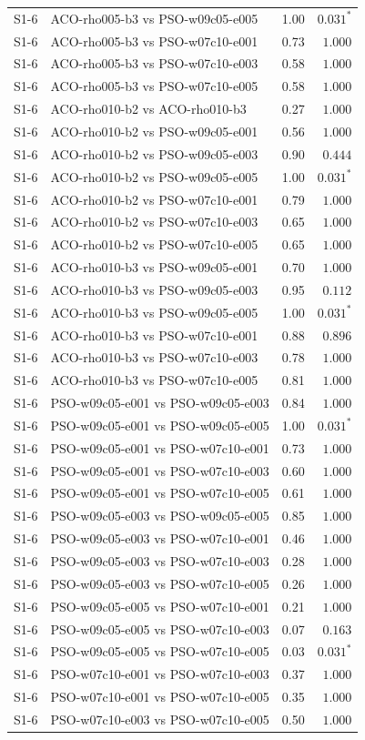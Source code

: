 \begin{tabular}{llrr}
S1-6 & ACO-rho005-b3 vs PSO-w09c05-e005 & 1.00 & $0.031^{*}$ \\
S1-6 & ACO-rho005-b3 vs PSO-w07c10-e001 & 0.73 & $1.000$ \\
S1-6 & ACO-rho005-b3 vs PSO-w07c10-e003 & 0.58 & $1.000$ \\
S1-6 & ACO-rho005-b3 vs PSO-w07c10-e005 & 0.58 & $1.000$ \\
S1-6 & ACO-rho010-b2 vs ACO-rho010-b3 & 0.27 & $1.000$ \\
S1-6 & ACO-rho010-b2 vs PSO-w09c05-e001 & 0.56 & $1.000$ \\
S1-6 & ACO-rho010-b2 vs PSO-w09c05-e003 & 0.90 & $0.444$ \\
S1-6 & ACO-rho010-b2 vs PSO-w09c05-e005 & 1.00 & $0.031^{*}$ \\
S1-6 & ACO-rho010-b2 vs PSO-w07c10-e001 & 0.79 & $1.000$ \\
S1-6 & ACO-rho010-b2 vs PSO-w07c10-e003 & 0.65 & $1.000$ \\
S1-6 & ACO-rho010-b2 vs PSO-w07c10-e005 & 0.65 & $1.000$ \\
S1-6 & ACO-rho010-b3 vs PSO-w09c05-e001 & 0.70 & $1.000$ \\
S1-6 & ACO-rho010-b3 vs PSO-w09c05-e003 & 0.95 & $0.112$ \\
S1-6 & ACO-rho010-b3 vs PSO-w09c05-e005 & 1.00 & $0.031^{*}$ \\
S1-6 & ACO-rho010-b3 vs PSO-w07c10-e001 & 0.88 & $0.896$ \\
S1-6 & ACO-rho010-b3 vs PSO-w07c10-e003 & 0.78 & $1.000$ \\
S1-6 & ACO-rho010-b3 vs PSO-w07c10-e005 & 0.81 & $1.000$ \\
S1-6 & PSO-w09c05-e001 vs PSO-w09c05-e003 & 0.84 & $1.000$ \\
S1-6 & PSO-w09c05-e001 vs PSO-w09c05-e005 & 1.00 & $0.031^{*}$ \\
S1-6 & PSO-w09c05-e001 vs PSO-w07c10-e001 & 0.73 & $1.000$ \\
S1-6 & PSO-w09c05-e001 vs PSO-w07c10-e003 & 0.60 & $1.000$ \\
S1-6 & PSO-w09c05-e001 vs PSO-w07c10-e005 & 0.61 & $1.000$ \\
S1-6 & PSO-w09c05-e003 vs PSO-w09c05-e005 & 0.85 & $1.000$ \\
S1-6 & PSO-w09c05-e003 vs PSO-w07c10-e001 & 0.46 & $1.000$ \\
S1-6 & PSO-w09c05-e003 vs PSO-w07c10-e003 & 0.28 & $1.000$ \\
S1-6 & PSO-w09c05-e003 vs PSO-w07c10-e005 & 0.26 & $1.000$ \\
S1-6 & PSO-w09c05-e005 vs PSO-w07c10-e001 & 0.21 & $1.000$ \\
S1-6 & PSO-w09c05-e005 vs PSO-w07c10-e003 & 0.07 & $0.163$ \\
S1-6 & PSO-w09c05-e005 vs PSO-w07c10-e005 & 0.03 & $0.031^{*}$ \\
S1-6 & PSO-w07c10-e001 vs PSO-w07c10-e003 & 0.37 & $1.000$ \\
S1-6 & PSO-w07c10-e001 vs PSO-w07c10-e005 & 0.35 & $1.000$ \\
S1-6 & PSO-w07c10-e003 vs PSO-w07c10-e005 & 0.50 & $1.000$ \\
\bottomrule
\end{tabular}
